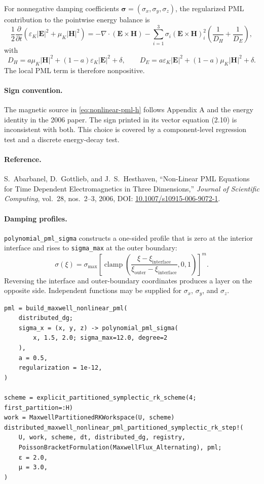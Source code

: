 \documentclass[11pt,oneside]{book}
\newcommand{\code}[1]{\texttt{#1}}
\newcommand{\vect}[1]{\boldsymbol{#1}}
\begin{document}
For nonnegative damping coefficients
$\vect\sigma=(\sigma_x,\sigma_y,\sigma_z)$, the regularized PML contribution
to the pointwise energy balance is
\begin{equation}
  \frac{1}{2}\frac{\partial}{\partial t}
  \left(\varepsilon_K|\vect E|^2+\mu_K|\vect H|^2\right)
  =
  -\nabla\cdot(\vect E\times\vect H)
  -
  \sum_{i=1}^{3}
    \sigma_i(\vect E\times\vect H)_i^2
    \left(\frac{1}{D_H}+\frac{1}{D_E}\right),
\end{equation}
with
\[
  D_H=a\mu_K|\vect H|^2+(1-a)\varepsilon_K|\vect E|^2+\delta,\qquad
  D_E=a\varepsilon_K|\vect E|^2+(1-a)\mu_K|\vect H|^2+\delta.
\]
The local PML term is therefore nonpositive.

\paragraph{Sign convention.}
The magnetic source in \cref{eq:nonlinear-pml-h} follows Appendix A and the
energy identity in the 2006 paper. The sign printed in its vector equation
(2.10) is inconsistent with both. This choice is covered by a component-level
regression test and a discrete energy-decay test.

\paragraph{Reference.}
S.~Abarbanel, D.~Gottlieb, and J.~S.~Hesthaven,
``Non-Linear PML Equations for Time Dependent Electromagnetics in Three
Dimensions,'' \emph{Journal of Scientific Computing}, vol.~28, nos.~2--3,
2006, DOI:
\href{https://doi.org/10.1007/s10915-006-9072-1}
{10.1007/s10915-006-9072-1}.

\paragraph{Damping profiles.}
\code{polynomial\_pml\_sigma} constructs a one-sided profile that is zero at
the interior interface and rises to \code{sigma\_max} at the outer boundary:
\[
  \sigma(\xi)
  =
  \sigma_{\max}
  \left[
    \operatorname{clamp}
    \left(
      \frac{\xi-\xi_{\mathrm{interface}}}
           {\xi_{\mathrm{outer}}-\xi_{\mathrm{interface}}},
      0,1
    \right)
  \right]^m.
\]
Reversing the interface and outer-boundary coordinates produces a layer on
the opposite side. Independent functions may be supplied for
$\sigma_x$, $\sigma_y$, and $\sigma_z$.

\begin{lstlisting}
pml = build_maxwell_nonlinear_pml(
    distributed_dg;
    sigma_x = (x, y, z) -> polynomial_pml_sigma(
        x, 1.5, 2.0; sigma_max=12.0, degree=2
    ),
    a = 0.5,
    regularization = 1e-12,
)

scheme = explicit_partitioned_symplectic_rk_scheme(4; first_partition=:H)
work = MaxwellPartitionedRKWorkspace(U, scheme)
distributed_maxwell_nonlinear_pml_partitioned_symplectic_rk_step!(
    U, work, scheme, dt, distributed_dg, registry,
    PoissonBracketFormulation(MaxwellFlux_Alternating), pml;
    ε = 2.0,
    μ = 3.0,
)
\end{lstlisting}
\end{document}
